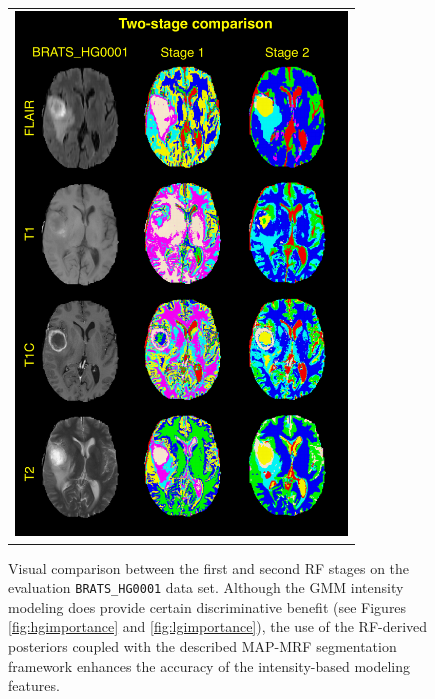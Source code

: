 \documentclass[preprint,authoryear,review,12pt]{elsarticle}
\begin{document}
\begin{figure}
  \centering
  \begin{tabular}{c}
    \includegraphics[width=88mm]{gmm_map_mrf.pdf}
  \end{tabular}
  \caption{Visual comparison between the first and second RF stages
  on the evaluation {\tt BRATS\_HG0001} data set.
  Although the GMM intensity modeling does provide certain 
  discriminative benefit (see Figures \ref{fig:hgimportance}
  and \ref{fig:lgimportance}), the use of the RF-derived posteriors 
  coupled with the described MAP-MRF segmentation framework enhances 
  the accuracy of the intensity-based modeling features.    
  }
  \label{fig:stageComparison}
\end{figure}


\end{document}
